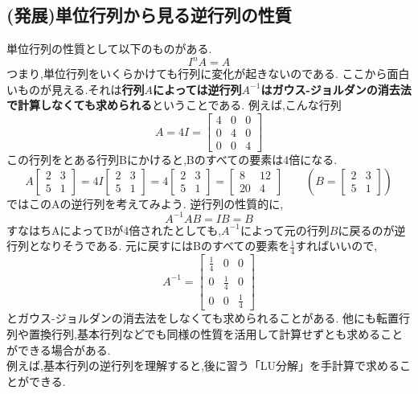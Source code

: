 \subsection{(発展)単位行列から見る逆行列の性質}\label{sub:I_inv}
単位行列の性質として以下のものがある.
\[
I^nA=A
\]
つまり,単位行列をいくらかけても行列に変化が起きないのである.
ここから面白いものが見える.それは\textbf{行列$A$によっては逆行列$A^{-1}$はガウス-ジョルダンの消去法で計算しなくても求められる}ということである.
例えば,こんな行列
\[
 A=4I = \begin{bmatrix}
    4 & 0 & 0 \\
    0 & 4 & 0 \\
    0 & 0 & 4
\end{bmatrix}
\]
この行列をとある行列Bにかけると,Bのすべての要素は4倍になる.
\[
A\begin{bmatrix}
    2 & 3 \\ 5 & 1
\end{bmatrix}
=4I\begin{bmatrix}
    2 & 3 \\ 5 & 1
\end{bmatrix}
=4\begin{bmatrix}
    2 & 3 \\ 5 & 1
\end{bmatrix}
=
\begin{bmatrix}
    8 & 12 \\ 20 & 4
\end{bmatrix}\qquad
\left(
    B=\begin{bmatrix}
    2 & 3 \\ 5 & 1
\end{bmatrix}
\right)
\]
ではこのAの逆行列を考えてみよう.
逆行列の性質的に,
\[
A^{-1}AB = IB = B
\]
すなはちAによってBが4倍されたとしても,$A^{-1}$によって元の行列$B$に戻るのが逆行列となりそうである.
元に戻すにはBのすべての要素を$\frac{1}{4}$すればいいので,
\[
A^{-1} = \begin{bmatrix}
    \frac{1}{4} & 0 & 0 \\
    0 & \frac{1}{4} & 0 \\
    0 & 0 & \frac{1}{4}
\end{bmatrix}
\]
とガウス-ジョルダンの消去法をしなくても求められることがある.
他にも転置行列や置換行列,基本行列などでも同様の性質を活用して計算せずとも求めることができる場合がある.\\
例えば,基本行列の逆行列を理解すると,後に習う「LU分解」を手計算で求めることができる.

